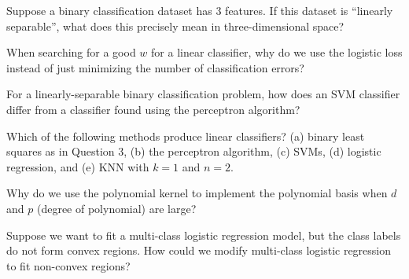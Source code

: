\documentclass{article}
\begin{document}
{\item Suppose a binary classification dataset has 3 features. If this dataset is ``linearly separable'', what does this precisely mean in three-dimensional space?
\item When searching for a good $w$ for a linear classifier, why do we use the logistic loss instead of just minimizing the number of classification errors?
\item For a linearly-separable binary classification problem, how does an SVM classifier differ from a classifier found using the perceptron algorithm?
\item Which of the following methods produce linear classifiers? (a) binary least squares as in Question 3, (b) the perceptron algorithm, (c) SVMs, (d) logistic regression, and (e) KNN with $k=1$ and $n=2$.
\item Why do we use the polynomial kernel to implement the polynomial basis when $d$ and $p$ (degree of polynomial) are large?
\item Suppose we want to fit a multi-class logistic regression model, but the class labels do not form convex regions. How could we modify multi-class logistic regression to fit non-convex regions?
}
\end{document}
